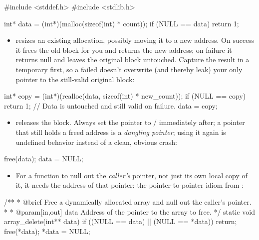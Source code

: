 \begin{ccode}
#include <stddef.h>
#include <stdlib.h>

int* data = (int*)(malloc(sizeof(int) * count));
if (NULL == data) { return 1; }
\end{ccode}

\begin{itemize}
  \item {} resizes an existing allocation, possibly moving it to a new
    address. On success it frees the old block for you and returns the new address; on failure it
    returns null and leaves the original block untouched. Capture the result in a temporary first,
    so a failed  doesn't overwrite (and thereby leak) your only pointer to the
    still-valid original block:
\end{itemize}

\begin{ccode}
int* copy = (int*)(realloc(data, sizeof(int) * new_count));
if (NULL == copy) { return 1; } // Data is untouched and still valid on failure.
data = copy;
\end{ccode}

\begin{itemize}
  \item {} releases the block. Always set the pointer to /
    immediately after; a pointer that still holds a freed address is a \emph{dangling pointer};
    using it again is undefined behavior instead of a clean, obvious crash:
\end{itemize}

\begin{ccode}
free(data);
data = NULL;
\end{ccode}

\begin{itemize}
  \item For a function to null out the \emph{caller's} pointer, not just its own local copy of it,
    it needs the address of that pointer: the pointer-to-pointer idiom from :
\end{itemize}

\begin{ccode}
/**
 * @brief Free a dynamically allocated array and null out the caller's pointer.
 *
 * @param[in,out] data Address of the pointer to the array to free.
 */
static void array_delete(int** data)
{
    if ((NULL == data) || (NULL == *data)) { return; }
    free(*data);
    *data = NULL;
}
\end{ccode}

